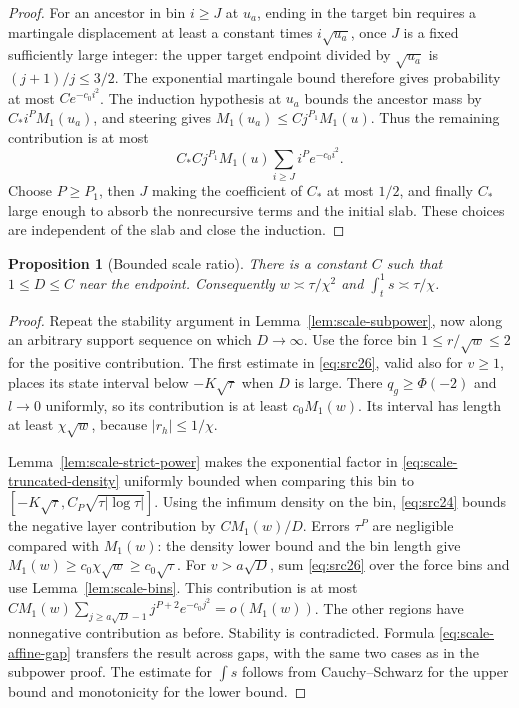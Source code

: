 \documentclass[11pt,a4paper]{article}
\numberwithin{equation}{section}
\newtheorem{proposition}[theorem]{Proposition}
\theoremstyle{definition}
\theoremstyle{remark}
\begin{document}
\begin{proof}
For an ancestor in bin $i\ge J$ at $u_a$, ending in the target bin
requires a martingale displacement at least a constant times
$i\sqrt{u_a}$, once $J$ is a fixed sufficiently large integer:
the upper target endpoint divided by $\sqrt{u_a}$ is
$(j+1)/j\le3/2$. The exponential martingale bound therefore gives
probability at most $C e^{-c_0i^2}$.
The induction hypothesis at $u_a$ bounds the ancestor mass by
$C_*i^P M_1(u_a)$, and steering gives
$M_1(u_a)\le Cj^{P_1}M_1(u)$. Thus the remaining contribution is at
most
\[
 C_*Cj^{P_1}M_1(u)\sum_{i\ge J}i^P e^{-c_0i^2}.
\]
Choose $P\ge P_1$, then $J$ making the coefficient of $C_*$ at most
$1/2$, and finally $C_*$ large enough to absorb the nonrecursive terms
and the initial slab. These choices are independent of the slab and
close the induction.
\end{proof}

\begin{proposition}[Bounded scale ratio]\label{prop:scale-bounded-D}
There is a constant $C$ such that $1\le D\le C$ near the endpoint.
Consequently $w\asymp\tau/\chi^2$ and
$\int_t^1s\asymp\tau/\chi$.
\end{proposition}
\begin{proof}
Repeat the stability argument in Lemma~\ref{lem:scale-subpower}, now
along an arbitrary support sequence on which $D\to\infty$.
Use the force bin $1\le r/\sqrt w\le2$ for the positive contribution.
The first estimate in \eqref{eq:src26}, valid also for $v\ge1$,
places its state interval below $-K\sqrt\tau$ when $D$ is large.
There $q_g\ge\Phi(-2)$ and $l\to0$ uniformly, so its contribution
is at least $c_0M_1(w)$. Its interval has length at least
$\chi\sqrt w$, because $|r_h|\le1/\chi$.

Lemma~\ref{lem:scale-strict-power} makes the exponential factor in
\eqref{eq:scale-truncated-density} uniformly bounded when comparing
this bin to $[-K\sqrt\tau,C_P\sqrt{\tau|\log\tau|}]$.
Using the infimum density on the bin, \eqref{eq:src24} bounds the
negative layer contribution by $CM_1(w)/D$. Errors $\tau^P$ are
negligible compared with $M_1(w)$: the density lower bound and the
bin length give $M_1(w)\ge c_0\chi\sqrt w\ge c_0\sqrt\tau$.
For $v>a\sqrt D$, sum \eqref{eq:src26} over the force bins and use
Lemma~\ref{lem:scale-bins}. This contribution is at most
$CM_1(w)\sum_{j\ge a\sqrt D-1}j^{P+2}e^{-c_0j^2}=o(M_1(w))$.
The other regions have nonnegative contribution as before. Stability
is contradicted. Formula \eqref{eq:scale-affine-gap} transfers the
result across gaps, with the same two cases as in the subpower proof.
The estimate for $\int s$ follows from Cauchy--Schwarz for the upper
bound and monotonicity for the lower bound.
\end{proof}
\end{document}
